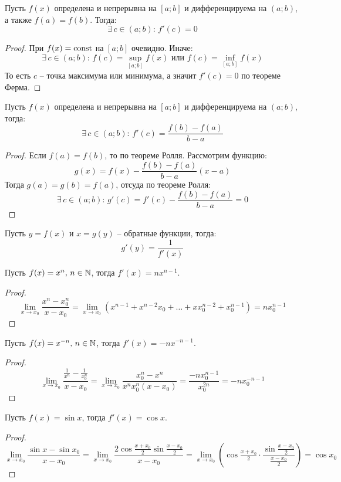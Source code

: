 \documentclass[12pt]{article}
\begin{document}
\begin{theorem}[Ролля]
    Пусть $f(x)$ определена и непрерывна на $\left[a;b\right]$ и дифференцируема на $(a;b)$, а также $f(a)=f(b)$. Тогда:
    $$\exists\,c\in(a;b):\,f'(c)=0$$
\end{theorem}
\begin{proof}
    При $f(x)=\operatorname{const}$ на $\left[a;b\right]$ очевидно. Иначе:
    $$\exists\,c\in(a;b):\,f(c)=\sup\limits_{\left[a;b\right]}f(x)\text{ или }f(c)=\inf\limits_{\left[a;b\right]}f(x)$$
    То есть $c$ -- точка максимума или минимума, а значит $f'(c)=0$ по теореме Ферма.
\end{proof}
\begin{theorem}[Лагранжа]
    Пусть $f(x)$ определена и непрерывна на $\left[a;b\right]$ и дифференцируема на $(a;b)$, тогда:
    $$\exists\,c\in(a;b):\,f'(c)=\frac{f(b)-f(a)}{b-a}$$
\end{theorem}
\begin{proof}
    Если $f(a)=f(b)$, то по теореме Ролля. Рассмотрим функцию:
    $$g(x)=f(x)-\frac{f(b)-f(a)}{b-a}(x-a)$$
    Тогда $g(a)=g(b)=f(a)$, отсуда по теореме Ролля:
    $$\exists\,c\in(a;b):\,g'(c)=f'(c)-\frac{f(b)-f(a)}{b-a}=0$$
\end{proof}
\begin{theorem}
    Пусть $y=f(x)$ и $x=g(y)$ -- обратные функции, тогда:
    $$g'(y)=\frac{1}{f'(x)}$$
\end{theorem}
\begin{statement}
    Пусть $f(x)=x^n,\,n\in\mathbb{N}$, тогда $f'(x)=nx^{n-1}$.
\end{statement}
\begin{proof}
    $$\lim_{x\to x_0}\frac{x^n-x_0^n}{x-x_0}=\lim_{x\to x_0}(x^{n-1}+x^{n-2}x_0+\ldots+xx_0^{n-2}+x_0^{n-1})=nx_0^{n-1}$$
\end{proof}
\begin{statement}
    Пусть $f(x)=x^{-n},\,n\in\mathbb{N}$, тогда $f'(x)=-nx^{-n-1}$.
\end{statement}
\begin{proof}
    $$\lim_{x\to x_0}\frac{\frac{1}{x^n}-\frac{1}{x_0^n}}{x-x_0}=\lim_{x\to x_0}\frac{x_0^n-x^n}{x^nx_0^n(x-x_0)}=\frac{-nx_0^{n-1}}{x_0^{2n}}=-nx_0^{-n-1}$$
\end{proof}
\begin{statement}
    Пусть $f(x)=\sin x$, тогда $f'(x)=\cos x$.
\end{statement}
\begin{proof}
    $$\lim_{x\to x_0}\frac{\sin x-\sin x_0}{x-x_0}=\lim_{x\to x_0}\frac{2\cos\frac{x+x_0}{2}\sin\frac{x-x_0}{2}}{x-x_0}=\lim_{x\to x_0}\left(\cos\tfrac{x+x_0}{2}\cdot\frac{\sin\frac{x-x_0}{2}}{\frac{x-x_0}{2}}\right)=\cos x_0$$
\end{proof}
\end{document}
